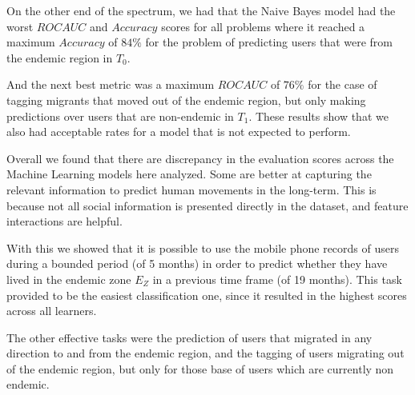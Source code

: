On the other end of the spectrum, we had that the Naive Bayes model had the worst $ROC AUC$ and $Accuracy$ scores for all problems where it reached a maximum $Accuracy$ of $84\%$ for the problem of predicting users that were from the endemic region in $T_0$.

And the next best metric was a maximum $ROC AUC$ of $76\%$ for the case of tagging migrants that moved out of the endemic region, but only making predictions over users that are non-endemic in $T_1$.
These results show that we also had acceptable rates for a model that is not expected to perform.

Overall we found that there are discrepancy in the evaluation scores across the Machine Learning models here analyzed.
Some are better at capturing the relevant information to predict human movements in the long-term.
This is because not all social information is presented directly in the dataset, and feature interactions are helpful.

With this we showed that it is possible to use the mobile phone records of users during a bounded period (of 5 months) in order to predict whether they have lived in the endemic zone $E_Z$ in a previous time frame (of 19 months).
This task provided to be the easiest classification one, since it resulted in the highest scores across all learners.

The other effective tasks were the prediction of users that migrated in any direction to and from the endemic region, and the tagging of users migrating out of the endemic region, but only for those base of users which are currently non endemic.






